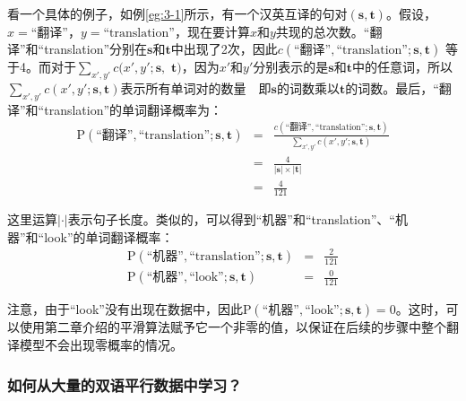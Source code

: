 \parinterval 看一个具体的例子，如例\ref{eg:3-1}所示，有一个汉英互译的句对$(\mathbf{s},\mathbf{t})$。假设，$x=\textrm{``翻译''}$，$y=\textrm{``translation''}$，现在要计算$x$和$y$共现的总次数。``翻译''和``translation''分别在$\mathbf{s}$和$\mathbf{t}$中出现了2次，因此$c(\textrm{``翻译''},\textrm{``translation''};\mathbf{s},\mathbf{t})$ 等于4。而对于$\sum_{x',y'} c(x',y';\mathbf{s},$ $\mathbf{t})$，因为$x'$和$y'$分别表示的是$\mathbf{s}$和$\mathbf{t}$中的任意词，所以$\sum_{x',y'} c(x',y';\mathbf{s},\mathbf{t})$表示所有单词对的数量\ \dash \ 即$\mathbf{s}$的词数乘以$\mathbf{t}$的词数。最后，``翻译''和``translation''的单词翻译概率为：
\begin{eqnarray}
\textrm{P}(\text{``翻译''},\text{``translation''}; \mathbf{s},\mathbf{t})  & = & \frac{c(\textrm{``翻译''},\textrm{``translation''};\mathbf{s},\mathbf{t})}{\sum_{x',y'} c(x',y';\mathbf{s},\mathbf{t})} \nonumber \\
                                                                                                         & =  & \frac{4}{|\mathbf{s}|\times |\mathbf{t}|} \nonumber \\
                                                                                                         & = & \frac{4}{121}
\label{eq:3-2}
\end{eqnarray}

\noindent 这里运算$|\cdot|$表示句子长度。类似的，可以得到``机器''和``translation''、``机器''和``look''的单词翻译概率：
\begin{eqnarray}
\textrm{P}(\text{``机器''},\text{``translation''}; \mathbf{s},\mathbf{t})  & = & \frac{2}{121} \\
\textrm{P}(\text{``机器''},\text{``look''}; \mathbf{s},\mathbf{t})  & =  & \frac{0}{121}
\label{eq:3-3}
\end{eqnarray}

\noindent 注意，由于``look''没有出现在数据中，因此$\textrm{P}(\text{``机器''},\text{``look''}; \mathbf{s},\mathbf{t})=0$。这时，可以使用第二章介绍的平滑算法赋予它一个非零的值，以保证在后续的步骤中整个翻译模型不会出现零概率的情况。


\subsubsection{如何从大量的双语平行数据中学习？}

